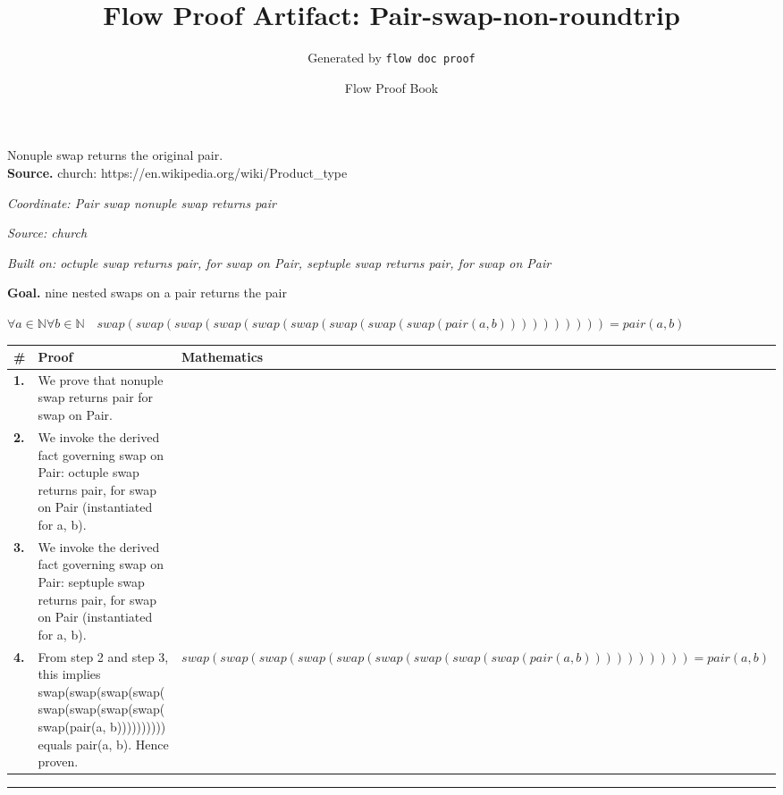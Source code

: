 \documentclass[11pt]{article}
\title{Flow Proof Artifact: Pair-swap-non-roundtrip}
\author{Generated by \texttt{flow doc proof}}
\date{Flow Proof Book}
\theoremstyle{definition}
\begin{document}
\maketitle
Nonuple swap returns the original pair.\\[0.5em]
\textbf{Source.} church: https://en.wikipedia.org/wiki/Product\_type\\[0.5em]
\bigskip
{}\par
\smallskip\noindent\textit{Coordinate: Pair \cdot swap \cdot nonuple swap returns pair}\par
\smallskip\noindent\textit{Source: church}\par
\smallskip\noindent\textit{Built on: octuple swap returns pair, for swap on Pair, septuple swap returns pair, for swap on Pair}\par
\medskip
\noindent\textbf{Goal.} nine nested swaps on a pair returns the pair\par
\noindent$\displaystyle \forall a \in \mathbb{N} \forall b \in \mathbb{N}\quad swap(swap(swap(swap(swap(swap(swap(swap(swap(pair(a, b)))))))))) = pair(a, b)$\par
\medskip
\noindent
\begin{tabular}{@{} >{\raggedright\arraybackslash}p{} >{\raggedright\arraybackslash}p{} >{\raggedleft\arraybackslash}p{} @{}}
\textbf{\#} & \textbf{Proof} & \textbf{Mathematics} \\
\midrule
\textbf{1.} & We prove that nonuple swap returns pair for swap on Pair. & \\[0.45em]
\textbf{2.} & We invoke the derived fact governing swap on Pair: octuple swap returns pair, for swap on Pair (instantiated for a, b). & \\[0.45em]
\textbf{3.} & We invoke the derived fact governing swap on Pair: septuple swap returns pair, for swap on Pair (instantiated for a, b). & \\[0.45em]
\textbf{4.} & From step 2 and step 3, this implies swap(swap(swap(swap(swap(swap(swap(swap(swap(pair(a, b)))))))))) equals pair(a, b). Hence proven. & $\displaystyle swap(swap(swap(swap(swap(swap(swap(swap(swap(pair(a, b)))))))))) = pair(a, b)$ \\[0.45em]
\bottomrule
\end{tabular}
\label{thm:Pair-swap-nonuple_swap_returns_pair}
\par\medskip\hrule
\end{document}
